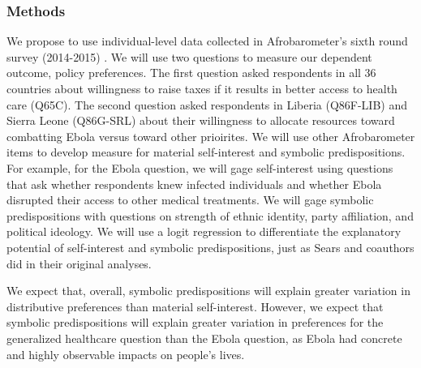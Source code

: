 \documentclass[]{article}
\begin{document}
\subsubsection{Methods}\label{methods}

We propose to use individual-level data collected in Afrobarometer's
sixth round survey (2014-2015) . We will use two questions to measure
our dependent outcome, policy preferences. The first question asked
respondents in all 36 countries about willingness to raise taxes if it
results in better access to health care (Q65C). The second question
asked respondents in Liberia (Q86F-LIB) and Sierra Leone (Q86G-SRL)
about their willingness to allocate resources toward combatting Ebola
versus toward other prioirites. We will use other Afrobarometer items to
develop measure for material self-interest and symbolic predispositions.
For example, for the Ebola question, we will gage self-interest using
questions that ask whether respondents knew infected individuals and
whether Ebola disrupted their access to other medical treatments. We
will gage symbolic predispositions with questions on strength of ethnic
identity, party affiliation, and political ideology. We will use a logit
regression to differentiate the explanatory potential of self-interest
and symbolic predispositions, just as Sears and coauthors did in their
original analyses.

We expect that, overall, symbolic predispositions will explain greater
variation in distributive preferences than material self-interest.
However, we expect that symbolic predispositions will explain greater
variation in preferences for the generalized healthcare question than
the Ebola question, as Ebola had concrete and highly observable impacts
on people's lives.
\end{document}
